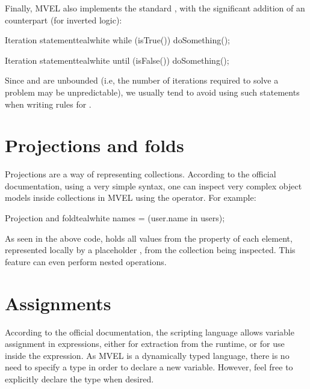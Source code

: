 Finally, \gls{MVEL} also implements the standard , with the significant addition of an  counterpart (for inverted logic):

\begin{codebox}{Iteration statement}{teal}{\icnote}{white}
while (isTrue()) {
   doSomething();
}
\end{codebox}

\begin{codebox}{Iteration statement}{teal}{\icnote}{white}
until (isFalse()) {
   doSomething();
}
\end{codebox}

Since  and  are unbounded (i.e, the number of iterations required to solve a problem may be unpredictable), we usually tend to avoid using such statements when writing rules for \arara.

\section{Projections and folds}
\label{sec:mvelprojectionsandfolds}

Projections are a way of representing collections. According to the official documentation, using a very simple syntax, one can inspect very complex object models inside collections in \gls{MVEL} using the  operator. For example:

\begin{codebox}{Projection and fold}{teal}{\icnote}{white}
names = (user.name in users);
\end{codebox}

As seen in the above code,  holds all values from the  property of each element, represented locally by a placeholder , from the collection  being inspected. This feature can even perform nested operations.

\section{Assignments}
\label{sec:mvelassignments}

According to the official documentation, the scripting language allows variable assignment in expressions, either for extraction from the runtime, or for use inside the expression. As \gls{MVEL} is a dynamically typed language, there is no need to specify a type in order to declare a new variable. However, feel free to explicitly declare the type when desired.

